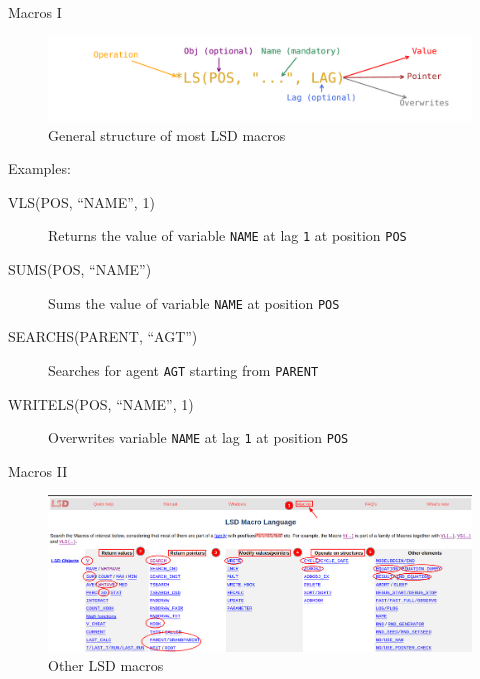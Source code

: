 \documentclass[bigger,aspectratio=169]{beamer}
\begin{document}
\begin{frame}[label={sec:orgf5ee8f4},fragile]{Macros I}
 \begin{figure}[htbp]
\centering
\includegraphics[width=.9\linewidth]{./figs/Macros_LSD.pdf}
\caption{\label{}General structure of most LSD macros}
\end{figure}

Examples:
\begin{description}
\item[{VLS(POS, ``NAME'', 1)}] Returns the value of variable \texttt{NAME} at lag \texttt{1} at position \texttt{POS}
\item[{SUMS(POS, ``NAME'')}] Sums the value of variable \texttt{NAME} at position \texttt{POS}
\item[{SEARCHS(PARENT, ``AGT'')}] Searches for agent \texttt{AGT} starting from \texttt{PARENT}
\item[{WRITELS(POS, ``NAME'', 1)}] Overwrites variable \texttt{NAME} at lag \texttt{1} at position \texttt{POS}
\end{description}
\end{frame}
\begin{frame}[label={sec:orgf209b52}]{Macros II}
\begin{figure}[htbp]
\centering
\includegraphics[width=.9\linewidth]{figs/LSD_Macros_ScreenShot.png}
\caption{Other LSD macros}
\end{figure}
\end{frame}
\end{document}
